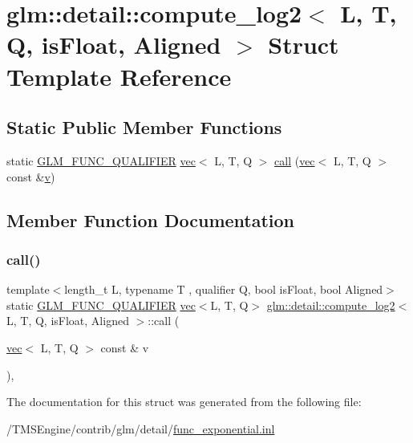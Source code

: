 \hypertarget{structglm_1_1detail_1_1compute__log2}{}\section{glm\+:\+:detail\+:\+:compute\+\_\+log2$<$ L, T, Q, is\+Float, Aligned $>$ Struct Template Reference}
\label{structglm_1_1detail_1_1compute__log2}
\subsection*{Static Public Member Functions}
\begin{DoxyCompactItemize}
\item 
static \hyperlink{setup_8hpp_a33fdea6f91c5f834105f7415e2a64407}{G\+L\+M\+\_\+\+F\+U\+N\+C\+\_\+\+Q\+U\+A\+L\+I\+F\+I\+ER} \hyperlink{structglm_1_1vec}{vec}$<$ L, T, Q $>$ \hyperlink{structglm_1_1detail_1_1compute__log2_acd539eb6855938b3b7b7f10573baff18}{call} (\hyperlink{structglm_1_1vec}{vec}$<$ L, T, Q $>$ const \&\hyperlink{_s_d_l__opengl_8h_a10a82eabcb59d2fcd74acee063775f90}{v})
\end{DoxyCompactItemize}


\subsection{Member Function Documentation}
\mbox{\label{structglm_1_1detail_1_1compute__log2_acd539eb6855938b3b7b7f10573baff18}} 
\subsubsection{\texorpdfstring{call()}{call()}}
{\footnotesize\ttfamily template$<$length\+\_\+t L, typename T , qualifier Q, bool is\+Float, bool Aligned$>$ \\
static \hyperlink{setup_8hpp_a33fdea6f91c5f834105f7415e2a64407}{G\+L\+M\+\_\+\+F\+U\+N\+C\+\_\+\+Q\+U\+A\+L\+I\+F\+I\+ER} \hyperlink{structglm_1_1vec}{vec}$<$L, T, Q$>$ \hyperlink{structglm_1_1detail_1_1compute__log2}{glm\+::detail\+::compute\+\_\+log2}$<$ L, T, Q, is\+Float, Aligned $>$\+::call (\begin{DoxyParamCaption}\item[{\hyperlink{structglm_1_1vec}{vec}$<$ L, T, Q $>$ const \&}]{v }\end{DoxyParamCaption})\hspace{0.3cm}{\ttfamily [inline]}, {\ttfamily [static]}}



The documentation for this struct was generated from the following file\+:\begin{DoxyCompactItemize}
\item 
/\+T\+M\+S\+Engine/contrib/glm/detail/\hyperlink{func__exponential_8inl}{func\+\_\+exponential.\+inl}\end{DoxyCompactItemize}
